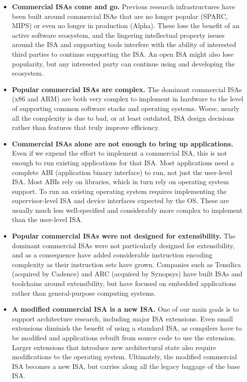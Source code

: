 \begin{commentary}
\begin{itemize}
\item {\bf Commercial ISAs come and go.}  Previous research
  infrastructures have been built around commercial ISAs that are no
  longer popular (SPARC, MIPS) or even no longer in production
  (Alpha).  These lose the benefit of an active software ecosystem,
  and the lingering intellectual property issues around the ISA and
  supporting tools interfere with the ability of interested third
  parties to continue supporting the ISA.  An open ISA might also lose
  popularity, but any interested party can continue using and
  developing the ecosystem.

\item {\bf Popular commercial ISAs are complex.}  The dominant
  commercial ISAs (x86 and ARM) are both very complex to implement in
  hardware to the level of supporting common software stacks and
  operating systems.  Worse, nearly all the complexity is due to bad,
  or at least outdated, ISA design decisions rather than features that
  truly improve efficiency.

\item {\bf Commercial ISAs alone are not enough to bring up
  applications.}  Even if we expend the effort to implement a
  commercial ISA, this is not enough to run existing applications for
  that ISA.  Most applications need a complete ABI (application binary
  interface) to run, not just the user-level ISA.  Most ABIs rely on
  libraries, which in turn rely on operating system support.  To run an
  existing operating system requires implementing the supervisor-level
  ISA and device interfaces expected by the OS.  These are usually
  much less well-specified and considerably more complex to
  implement than the user-level ISA.

\item {\bf Popular commercial ISAs were not designed for extensibility.}  The
  dominant commercial ISAs were not particularly designed for
  extensibility, and as a consequence have added considerable
  instruction encoding complexity as their instruction sets have
  grown.  Companies such as Tensilica (acquired by Cadence) and ARC
  (acquired by Synopsys) have built ISAs and toolchains around
  extensibility, but have focused on embedded applications rather than
  general-purpose computing systems.

\item {\bf A modified commercial ISA is a new ISA.} One of our main
  goals is to support architecture research, including major ISA
  extensions.  Even small extensions diminish the benefit of using a
  standard ISA, as compilers have to be modified and applications
  rebuilt from source code to use the extension.  Larger extensions
  that introduce new architectural state also require modifications to
  the operating system.  Ultimately, the modified commercial ISA
  becomes a new ISA, but carries along all the legacy baggage of the
  base ISA.
\end{itemize}


\end{commentary}
